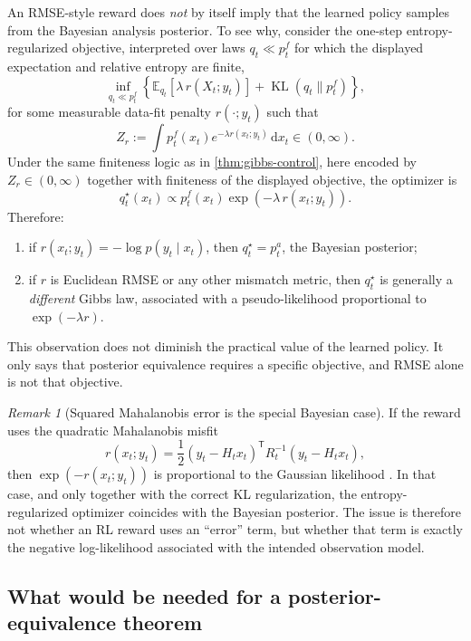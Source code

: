 \documentclass[11pt]{article}
\newcommand{\E}{\mathbb{E}}
\newcommand{\KL}{\operatorname{KL}}
\newcommand{\dd}{\,\mathrm d}
\newcommand{\bracks}[1]{\left[ #1 \right]}
\newcommand{\parens}[1]{\left( #1 \right)}
\newcommand{\transpose}{^{\mathsf T}}
\numberwithin{equation}{section}
\theoremstyle{plain}
\theoremstyle{definition}
\theoremstyle{remark}
\newtheorem{remark}[theorem]{Remark}
\begin{document}
An RMSE-style reward does \emph{not} by itself imply that the learned policy samples from the Bayesian analysis posterior. To see why, consider the one-step entropy-regularized objective, interpreted over laws $q_t\ll p_t^f$ for which the displayed expectation and relative entropy are finite,
\begin{equation}
\inf_{q_t\ll p_t^f}
\left\{
\E_{q_t}\!\bracks{\lambda\,r(X_t;y_t)}
+\KL(q_t\|p_t^f)
\right\},
\label{eq:generic-gibbs-objective}
\end{equation}
for some measurable data-fit penalty $r(\cdot;y_t)$ such that
\[
Z_r:=\int p_t^f(x_t)e^{-\lambda r(x_t;y_t)}\dd x_t\in(0,\infty).
\]
Under the same finiteness logic as in \cref{thm:gibbs-control}, here encoded by $Z_r\in(0,\infty)$ together with finiteness of the displayed objective, the optimizer is
\begin{equation}
q_t^\star(x_t)
\propto
p_t^f(x_t)\exp\parens{-\lambda\,r(x_t;y_t)}.
\label{eq:gibbs-rmse}
\end{equation}
Therefore:
\begin{enumerate}[label=\arabic*.]
\item if $r(x_t;y_t)=-\log p(y_t\mid x_t)$, then $q_t^\star=p_t^a$, the Bayesian posterior;
\item if $r$ is Euclidean RMSE or any other mismatch metric, then $q_t^\star$ is generally a \emph{different} Gibbs law, associated with a pseudo-likelihood proportional to $\exp(-\lambda r)$.
\end{enumerate}
This observation does not diminish the practical value of the learned policy. It only says that posterior equivalence requires a specific objective, and RMSE alone is not that objective.

\begin{remark}[Squared Mahalanobis error is the special Bayesian case]
\label{rem:mahalanobis}
If the reward uses the quadratic Mahalanobis misfit
\[
r(x_t;y_t)=\frac12(y_t-H_tx_t)\transpose R_t^{-1}(y_t-H_tx_t),
\]
then $\exp(-r(x_t;y_t))$ is proportional to the Gaussian likelihood \citep{kalman1960,lorenc1986}. In that case, and only together with the correct KL regularization, the entropy-regularized optimizer coincides with the Bayesian posterior. The issue is therefore not whether an RL reward uses an ``error'' term, but whether that term is exactly the negative log-likelihood associated with the intended observation model.
\end{remark}

\subsection{What would be needed for a posterior-equivalence theorem}
\end{document}
